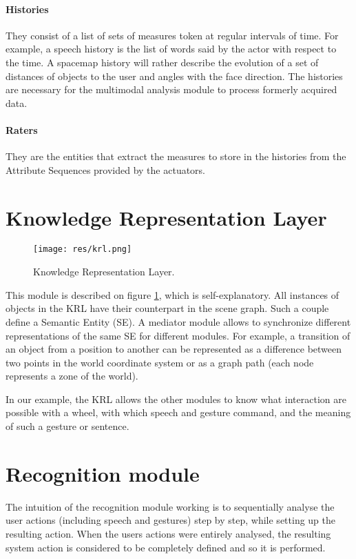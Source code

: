\documentclass[a4paper]{article}
\begin{document}
\paragraph{Histories} They consist of a list of sets of measures token at regular intervals of time. For example, a speech history is the list of words said by the actor with respect to the time. A spacemap history will rather describe the evolution of a set of distances of objects to the user and angles with the face direction. The histories are necessary for the multimodal analysis module to process formerly acquired data.

\paragraph{Raters} They are the entities that extract the measures to store in the histories from the Attribute Sequences provided by the actuators.

\section{Knowledge Representation Layer}

\begin{figure}
\centering
\texttt{[image: res/krl.png]}
\caption{\label{fig:krl}Knowledge Representation Layer.}
\end{figure}

This module is described on figure \ref{fig:krl}, which is self-explanatory. All instances of objects in the KRL have their counterpart in the scene graph. Such a couple define a Semantic Entity (SE). A mediator module allows to synchronize different representations of the same SE for different modules. For example, a transition of an object from a position to another can be represented as a difference between two points in the world coordinate system or as a graph path (each node represents a zone of the world).

In our example, the KRL allows the other modules to know what interaction are possible with a wheel, with which speech and gesture command, and the meaning of such a gesture or sentence.

\section{Recognition module}

The intuition of the recognition module working is to sequentially analyse the user actions (including speech and gestures) step by step, while setting up the resulting action. When the users actions were entirely analysed, the resulting system action is considered to be completely defined and so it is performed.
\end{document}
